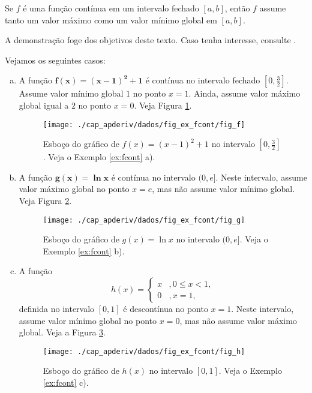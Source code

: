 \begin{teo}\label{teo:valorextremo}
  Se $f$ é uma função contínua em um intervalo fechado $[a, b]$, então $f$ assume tanto um valor máximo como um valor mínimo global em $[a, b]$.
\end{teo}
\begin{dem}
  A demonstração foge dos objetivos deste texto. Caso tenha interesse, consulte \cite{Avila1993a}.
\end{dem}

\begin{ex}\label{ex:fcont}
  Vejamos os seguintes casos:
  \begin{enumerate}[a)]
  \item  A função $\pmb{f(x) = (x-1)^2+1}$ é contínua no intervalo fechado $\displaystyle \left[0, \frac{3}{2}\right]$. Assume valor mínimo global $1$ no ponto $x=1$. Ainda, assume valor máximo global igual a $2$ no ponto $x=0$. Veja Figura \ref{fig:ex_fcont_f}.
  \begin{figure}[H]
    \centering
    \texttt{[image: ./cap\_apderiv/dados/fig\_ex\_fcont/fig\_f]}
    \caption{Esboço do gráfico de $f(x) = (x-1)^2+1$ no intervalo $\displaystyle\left[0, \frac{3}{2}\right]$. Veja o Exemplo \ref{ex:fcont} a).}
    \label{fig:ex_fcont_f}
  \end{figure}
\item A função $\pmb{g(x) = \ln x}$ é contínua no intervalo $(0, e]$. Neste intervalo, assume valor máximo global no ponto $x=e$, mas não assume valor mínimo global. Veja Figura \ref{fig:ex_fcont_g}.
  \begin{figure}[H]
    \centering
    \texttt{[image: ./cap\_apderiv/dados/fig\_ex\_fcont/fig\_g]}
    \caption{Esboço do gráfico de $g(x) = \ln x$ no intervalo $(0,e]$. Veja o Exemplo \ref{ex:fcont} b).}
    \label{fig:ex_fcont_g}
  \end{figure}
  
\item A função
  \begin{equation}
    h(x) = \left\{
      \begin{array}{ll}
        x &, 0\leq x < 1,\\
        0 &, x=1,
      \end{array}
\right.
\end{equation}
definida no intervalo $[0, 1]$ é descontínua no ponto $x=1$. Neste intervalo, assume valor mínimo global no ponto $x=0$, mas não assume valor máximo global. Veja a Figura \ref{fig:ex_fcont_h}.
  \begin{figure}[H]
    \centering
    \texttt{[image: ./cap\_apderiv/dados/fig\_ex\_fcont/fig\_h]}
    \caption{Esboço do gráfico de $h(x)$ no intervalo $[0,1]$. Veja o Exemplo \ref{ex:fcont} c).}
    \label{fig:ex_fcont_h}
  \end{figure}
  \end{enumerate}
\end{ex}

